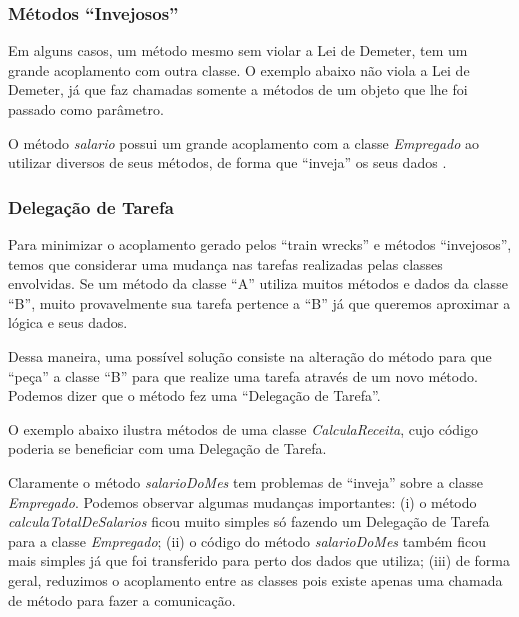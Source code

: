 \subsubsection{Métodos ``Invejosos''}
Em alguns casos, um método mesmo sem violar a Lei de Demeter, tem um grande acoplamento com outra classe.
O exemplo abaixo não viola a Lei de Demeter, já que faz chamadas somente a métodos de um objeto que lhe foi passado como parâmetro.



O método \textit{salario} possui um grande acoplamento com a classe \textit{Empregado} ao utilizar diversos de seus métodos, de forma 
que ``inveja'' os seus dados \citep{Fowler99}.

\subsubsection{Delegação de Tarefa}
Para minimizar o acoplamento gerado pelos ``train wrecks'' e métodos ``invejosos'', temos que considerar uma mudança nas 
tarefas realizadas pelas classes envolvidas. Se um método da classe ``A'' utiliza muitos métodos e dados da classe ``B'', muito 
provavelmente sua tarefa pertence a ``B'' já que queremos aproximar a lógica e seus dados.

Dessa maneira, uma possível solução consiste na alteração do método para que ``peça'' a classe ``B'' para que realize uma tarefa 
através de um novo método. Podemos dizer que o método fez uma ``Delegação de Tarefa''.

O exemplo abaixo ilustra métodos de uma classe \textit{CalculaReceita}, cujo código poderia se beneficiar com uma Delegação de Tarefa.



Claramente o método \textit{salarioDoMes} tem problemas de ``inveja'' sobre a classe \textit{Empregado}. Podemos observar algumas mudanças 
importantes: (i) o método \textit{calculaTotalDeSalarios} ficou muito simples só fazendo um Delegação de Tarefa para a classe \textit{Empregado}; 
(ii) o código do método \textit{salarioDoMes} também ficou mais simples já que foi transferido para perto dos dados que utiliza; (iii) de forma 
geral, reduzimos o acoplamento entre as classes pois existe apenas uma chamada de método para fazer a comunicação.

